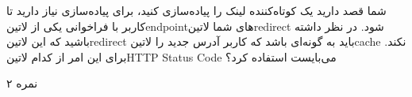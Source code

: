 \documentclass[../main.tex]{subfiles}
\begin{document}

شما قصد دارید یک کوتاه‌کننده لینک را پیاده‌سازی کنید، برای پیاده‌سازی نیاز دارید تا کاربر با فراخوانی یکی از ‌لاتین{endpoint}های شما ‌لاتین{redirect} شود. در نظر داشته باشید که این ‌لاتین{redirect} باید به گونه‌ای باشد که کاربر آدرس جدید را ‌لاتین{cache} نکند.
برای این امر از کدام ‌لاتین{HTTP Status Code} می‌بایست استفاده کرد؟

۲ نمره
\end{document}
